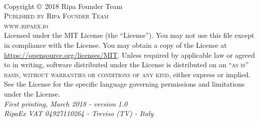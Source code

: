 \documentclass[11pt,fleqn]{book} %
\begin{document}
\begingroup
\thispagestyle{empty}
\endgroup

\newpage
~\vfill
\thispagestyle{empty}

\noindent Copyright \copyright\ 2018 Ripa Founder Team\\ %

\noindent \textsc{Published by Ripa Founder Team}\\ %

\noindent \textsc{www.ripaex.io}\\ %

\noindent Licensed under the MIT License (the ``License''). You may not use this file except in compliance with the License. 
You may obtain a copy of the License at \url{https://opensource.org/licenses/MIT}. Unless required by applicable law or agreed to in writing, 
software distributed under the License is distributed on an \textsc{``as is'' basis, without warranties or conditions of any kind}, 
either express or implied. See the License for the specific language governing permissions and limitations under the License.\\ %

\noindent \textit{First printing, March 2018 - version 1.0}\\ %

\noindent \textit{RipaEx VAT 04927110264 - Treviso (TV) - Italy} %

\pagestyle{empty} %
\usechapterimagefalse %
\end{document}
